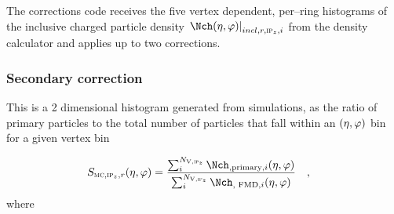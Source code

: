 \documentclass[compat,11pt]{alicenote}
\newcommand\mult[1][]{\Nch\ifx|#1|\relax\else_{#1}\fi}
\newcommand*{\etaphi}{\ensuremath(\eta,\varphi)}
\newcommand{\N}[2]{{\ensuremath N_{#1#2}}}
\newcommand{\NV}[1][]{\N{\text{V}}{#1}}
\newcommand*\SecMap{\ensuremath S_{\subMC,\subIPz,r}\etaphi}
\newcommand{\dndetadphi}[1][]{{\ensuremath%
    \ifx|#1|\else\left.\fi%
      \Nch\etaphi%
      \ifx|#1|\else\right|_{#1}\fi}}
\begin{document}
The corrections code receives the five vertex dependent,
per--ring histograms of the inclusive charged particle density
$\dndetadphi[incl,r,\subIPz,i]$ from the density calculator and applies
up to two corrections.   

\subsubsection{Secondary correction}
\label{sec:sub:sub:secmap}
This is a 2 dimensional histogram generated from simulations, as the
ratio of primary particles to the total number of particles that fall
within an $\etaphi$ bin for a given vertex bin

\begin{align}
  \label{eq:secondary}
  \SecMap{} &=
  \frac{\sum_i^{\NV[,\subIPz]}\mult[,\text{primary},i]\etaphi}{
    \sum_i^{\NV[,\subIPz]}\mult[,\text{\FMD{}},i]\etaphi}\quad,
\end{align}
where 
\end{document}
